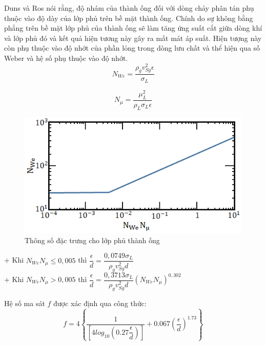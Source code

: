 \documentclass[12pt,a4paper]{report}
\begin{document}
Duns và Ros nói rằng, độ nhám của thành ống đối với dòng chảy phân tán phụ thuộc vào độ dày của lớp phủ trên bề mặt thành ống. Chính do sự không bằng phẳng trên bề mặt lớp phủ của thành ống sẽ làm tăng ứng suất cắt giữa dòng khí và lớp phủ đó và kết quả hiện tương này gây ra mất mát áp suất. Hiện tượng này còn phụ thuộc vào độ nhớt của phần lỏng trong dòng lưu chất và thể hiện qua số Weber và hệ số phụ thuộc vào độ nhớt.
 	\begin{equation}
     N_{We}= \dfrac{\rho_gv_{Sg}^2\epsilon}{\sigma_L}
    \end{equation}
    
    \begin{equation}
    N_\mu=\dfrac{\mu_L^2}{\rho_L\sigma_L\epsilon}
    \end{equation}
    
   	\begin{figure}[h]
   		\centering
   		\includegraphics[scale=0.9]{Fig/params_for_envelop_wall_pipe.png}
   		\caption[Thông số đặc trưng cho lớp phủ thành ống]{Thông số đặc trưng cho lớp phủ thành ống \cite{brill1999multiphase}}
   		\label{fig:params_for_envelop_wall_pipe}
   	\end{figure}

\hspace*{1cm}+ Khi $N_{We}N_\mu\leq0,005$ thì $\dfrac{\epsilon}{d}= \dfrac{0,0749\sigma_L}{\rho_gv_{Sg}^2d}$\\

\hspace*{1cm}+ Khi $N_{We}N_\mu>0,005$ thì $\dfrac{\epsilon}{d}= \dfrac{0,3713\sigma_L}{\rho_gv_{Sg}^2d}(N_{We}N_\mu)^{0,302}$

Hệ số ma sát $f$ được xác định qua công thức:
   	\begin{equation}
    	f = 4\left\{\dfrac{1}{\left[4log_{10}\left(0.27\dfrac{\epsilon}{d}\right)\right]}+0.067\left(\dfrac{\epsilon}{d}\right)^{1.73}\right\}
    \end{equation}
   
\end{document}
